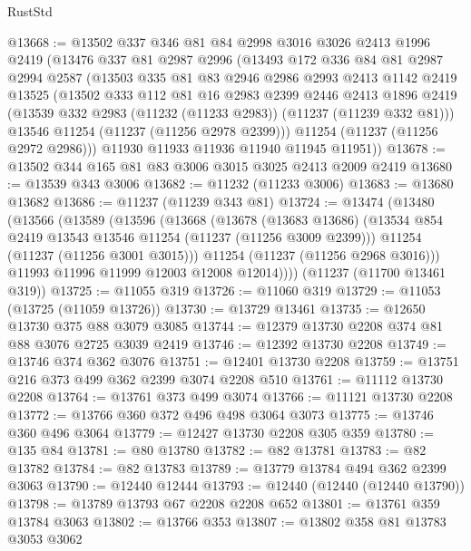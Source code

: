 \begin{lexlean}{RustStd}
\begin{coremodule}
@13668 := @13502
    @337
    @346
    @81
    @84
    @2998
    @3016
    @3026
    @2413
    @1996
    @2419
    (@13476
      @337
      @81
      @2987
      @2996
      (@13493
        @172
        @336
        @84
        @81
        @2987
        @2994
        @2587
        (@13503
          @335
          @81
          @83
          @2946
          @2986
          @2993
          @2413
          @1142
          @2419
          @13525
          (@13502
            @333
            @112
            @81
            @16
            @2983
            @2399
            @2446
            @2413
            @1896
            @2419
            (@13539 @332 @2983 (@11232 (@11233 @2983)) (@11237 (@11239 @332 @81)))
            @13546
            @11254
            (@11237 (@11256 @2978 @2399)))
          @11254
          (@11237 (@11256 @2972 @2986)))
        @11930
        @11933
        @11936
        @11940
        @11945
        @11951))
@13678 := @13502 @344 @165 @81 @83 @3006 @3015 @3025 @2413 @2009 @2419
@13680 := @13539 @343 @3006
@13682 := @11232 (@11233 @3006)
@13683 := @13680 @13682
@13686 := @11237 (@11239 @343 @81)
@13724 := @13474
    (@13480
      (@13566
        (@13589
          (@13596
            (@13668
              (@13678
                (@13683 @13686)
                (@13534 @854 @2419 @13543 @13546 @11254 (@11237 (@11256 @3009 @2399)))
                @11254
                (@11237 (@11256 @3001 @3015)))
              @11254
              (@11237 (@11256 @2968 @3016)))
            @11993
            @11996
            @11999
            @12003
            @12008
            @12014))))
    (@11237 (@11700 @13461 @319))
@13725 := @11055 @319
@13726 := @11060 @319
@13729 := @11053 (@13725 (@11059 @13726))
@13730 := @13729 @13461
@13735 := @12650 @13730 @375 @88 @3079 @3085
@13744 := @12379 @13730 @2208 @374 @81 @88 @3076 @2725 @3039 @2419
@13746 := @12392 @13730 @2208
@13749 := @13746 @374 @362 @3076
@13751 := @12401 @13730 @2208
@13759 := @13751 @216 @373 @499 @362 @2399 @3074 @2208 @510
@13761 := @11112 @13730 @2208
@13764 := @13761 @373 @499 @3074
@13766 := @11121 @13730 @2208
@13772 := @13766 @360 @372 @496 @498 @3064 @3073
@13775 := @13746 @360 @496 @3064
@13779 := @12427 @13730 @2208 @305 @359
@13780 := @135 @84
@13781 := @80 @13780
@13782 := @82 @13781
@13783 := @82 @13782
@13784 := @82 @13783
@13789 := @13779 @13784 @494 @362 @2399 @3063
@13790 := @12440 @12444
@13793 := @12440 (@12440 (@12440 @13790))
@13798 := @13789 @13793 @67 @2208 @2208 @652
@13801 := @13761 @359 @13784 @3063
@13802 := @13766 @353
@13807 := @13802 @358 @81 @13783 @3053 @3062

\end{coremodule}
\end{lexlean}
